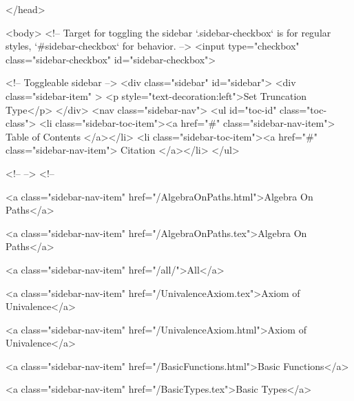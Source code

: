   
</head>




  <body>
    <!-- Target for toggling the sidebar `.sidebar-checkbox` is for regular
     styles, `#sidebar-checkbox` for behavior. -->
<input type="checkbox" class="sidebar-checkbox" id="sidebar-checkbox">

<!-- Toggleable sidebar -->
<div class="sidebar" id="sidebar">
  <div class="sidebar-item" >
    <p style="text-decoration:left">Set Truncation Type</p>
  </div>
  <nav class="sidebar-nav">
    <ul id="toc-id" class="toc-class">
  <li class="sidebar-toc-item"><a href="#" class="sidebar-nav-item"> Table of Contents </a></li>
  <li class="sidebar-toc-item"><a href="#" class="sidebar-nav-item"> Citation </a></li>
</ul>


    <!--  -->
    <!-- 
      
    
      
    
      
    
      
        
      
    
      
        
          <a class="sidebar-nav-item" href="/AlgebraOnPaths.html">Algebra On Paths</a>
        
      
    
      
        
          <a class="sidebar-nav-item" href="/AlgebraOnPaths.tex">Algebra On Paths</a>
        
      
    
      
        
          <a class="sidebar-nav-item" href="/all/">All</a>
        
      
    
      
        
          <a class="sidebar-nav-item" href="/UnivalenceAxiom.tex">Axiom of Univalence</a>
        
      
    
      
        
          <a class="sidebar-nav-item" href="/UnivalenceAxiom.html">Axiom of Univalence</a>
        
      
    
      
        
          <a class="sidebar-nav-item" href="/BasicFunctions.html">Basic Functions</a>
        
      
    
      
        
          <a class="sidebar-nav-item" href="/BasicTypes.tex">Basic Types</a>
        

